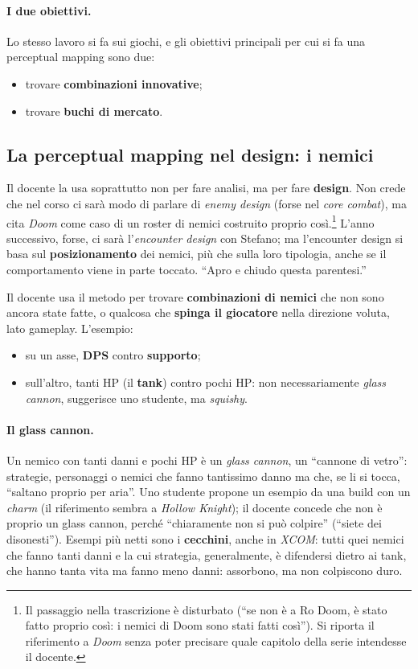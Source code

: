 \paragraph{I due obiettivi.} Lo stesso lavoro si fa sui giochi, e gli
obiettivi principali per cui si fa una perceptual mapping sono due:
\begin{itemize}
  \item trovare \textbf{combinazioni innovative};
  \item trovare \textbf{buchi di mercato}.
\end{itemize}

\subsection{La perceptual mapping nel design: i nemici}

Il docente la usa soprattutto non per fare analisi, ma per fare
\textbf{design}. Non crede che nel corso ci sarà modo di parlare di
\emph{enemy design} (forse nel \emph{core combat}), ma cita \emph{Doom} come
caso di un roster di nemici costruito proprio così.\footnote{Il passaggio
nella trascrizione è disturbato (``se non è a Ro Doom, è stato fatto proprio
così: i nemici di Doom sono stati fatti così''). Si riporta il riferimento a
\emph{Doom} senza poter precisare quale capitolo della serie intendesse il
docente.} L'anno successivo, forse, ci sarà l'\emph{encounter design} con
Stefano; ma l'encounter design si basa sul \textbf{posizionamento} dei
nemici, più che sulla loro tipologia, anche se il comportamento viene in
parte toccato. ``Apro e chiudo questa parentesi.''

Il docente usa il metodo per trovare \textbf{combinazioni di nemici} che non
sono ancora state fatte, o qualcosa che \textbf{spinga il giocatore} nella
direzione voluta, lato gameplay. L'esempio:
\begin{itemize}
  \item su un asse, \textbf{DPS} contro \textbf{supporto};
  \item sull'altro, tanti HP (il \textbf{tank}) contro pochi HP: non
        necessariamente \emph{glass cannon}, suggerisce uno studente, ma
        \emph{squishy}.
\end{itemize}

\paragraph{Il glass cannon.} Un nemico con tanti danni e pochi HP è un
\emph{glass cannon}, un ``cannone di vetro'': strategie, personaggi o nemici
che fanno tantissimo danno ma che, se li si tocca, ``saltano proprio per
aria''. Uno studente propone un esempio da una build con un \emph{charm} (il
riferimento sembra a \emph{Hollow Knight}); il docente concede che non è
proprio un glass cannon, perché ``chiaramente non si può colpire'' (``siete
dei disonesti''). Esempi più netti sono i \textbf{cecchini}, anche in
\emph{XCOM}: tutti quei nemici che fanno tanti danni e la cui strategia,
generalmente, è difendersi dietro ai tank, che hanno tanta vita ma fanno meno
danni: assorbono, ma non colpiscono duro.

